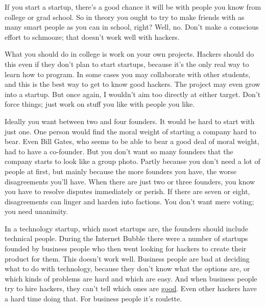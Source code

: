 If you start a
                    startup, there's a good chance it will be with people you
                    know from college or grad school. So in theory you ought to
                    try to make friends with as many smart people as you can in
                    school, right? Well, no. Don't make a conscious effort to
                    schmooze; that doesn't work well with hackers.

What
                    you should do in college is work on your own projects.
                    Hackers should do this even if they don't plan to start
                    startups, because it's the only real way to learn how to
                    program. In some cases you may collaborate with other
                    students, and this is the best way to get to know good
                    hackers. The project may even grow into a startup. But once
                    again, I wouldn't aim too directly at either target. Don't
                    force things; just work on stuff you like with people you
                    like.

Ideally you want between two and four
                    founders. It would be hard to start with just one. One
                    person would find the moral weight of starting a company
                    hard to bear. Even Bill Gates, who seems to be able to bear
                    a good deal of moral weight, had to have a co-founder. But
                    you don't want so many founders that the company starts to
                    look like a group photo. Partly because you don't need a lot
                    of people at first, but mainly because the more founders you
                    have, the worse disagreements you'll have. When there are
                    just two or three founders, you know you have to resolve
                    disputes immediately or perish. If there are seven or eight,
                    disagreements can linger and harden into factions. You don't
                    want mere voting; you need unanimity.

In a
                    technology startup, which most startups are, the founders
                    should include technical people. During the Internet Bubble
                    there were a number of startups founded by business people
                    who then went looking for hackers to create their product
                    for them. This doesn't work well. Business people are bad at
                    deciding what to do with technology, because they don't know
                    what the options are, or which kinds of problems are hard
                    and which are easy. And when business people try to hire
                    hackers, they can't tell which ones are
                    \href{http://www.paulgraham.com/gh.html}{good}. Even other hackers have a hard
                    time doing that. For business people it's roulette.

